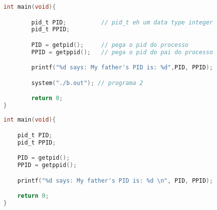 \documentclass[11pt]{amsart}
\begin{document}
\begin{lstlisting}[caption ={Programa 1, o pai.},language=C]
int main(void){

        pid_t PID;			// pid_t eh um data type integer
        pid_t PPID;

        PID = getpid();		// pega o pid do processo
        PPID = getppid();   // pega o pid do pai do processo

        printf("%d says: My father's PID is: %d",PID, PPID);

        system("./b.out"); // programa 2

        return 0;
}
\end{lstlisting}

\vspace{.5cm}

\begin{lstlisting}[caption ={Programa 2, o filho.},language=C]
int main(void){

    pid_t PID;
    pid_t PPID;

    PID = getpid();
    PPID = getppid();

    printf("%d says: My father's PID is: %d \n", PID, PPID);

	return 0;
}
\end{lstlisting}                 
\end{document}
